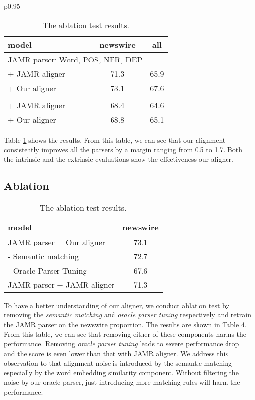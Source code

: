 \documentclass[11pt,a4paper]{article}
\begin{document}
\begin{table}[t]
\begin{tabular}{p{}}
\begin{table}[t]
	\centering
	\begin{tabular}{lcc}
		\hline
		model & newswire & all \\
		\hline
		\multicolumn{2}{l}{JAMR parser: Word, POS, NER, DEP} & \\
		\quad + JAMR aligner & 71.3 & 65.9 \\
		\quad + Our aligner & 73.1 & 67.6 \\
		\hdashline
		\multicolumn{2}{l}{CAMR parser: Word, POS, NER, DEP} & \\
		\quad + JAMR aligner & 68.4 & 64.6 \\
		\quad + Our aligner & 68.8 & 65.1 \\
		\hline
	\end{tabular}
	\caption{The parsing results.
	}\label{tbl:ext-eval}
\end{table}

Table \ref{tbl:ext-eval} shows the results.
From this table, we can see that our alignment
consistently improves all the parsers by a margin ranging
from 0.5 to 1.7.
Both the intrinsic and the extrinsic evaluations show the effectiveness
our aligner.

\subsection{Ablation}

\begin{table}[t]
	\centering
	\begin{tabular}{lc}
		\hline
		model & newswire  \\
		\hline
		JAMR parser + Our aligner & 73.1 \\
		\quad - Semantic matching & 72.7 \\
		\quad - Oracle Parser Tuning & 67.6 \\
		JAMR parser + JAMR aligner & 71.3 \\
		\hline
	\end{tabular}
	\caption{The ablation test results.}\label{tbl:abl-test}
\end{table}

To have a better understanding of our aligner, we conduct
ablation test by removing the
{\it semantic matching} and {\it oracle parser tuning} respectively
and retrain the JAMR parser on the newswire proportion.
The results are shown in Table \ref{tbl:abl-test}.
From this table, we can see that removing either of these components
harms the performance. 
Removing {\it oracle parser tuning} leads to severe performance drop
and the score is even lower than that with JAMR aligner.
We address this observation to that alignment noise is introduced by
the semantic matching especially by the word embedding similarity component.
Without filtering the noise by our oracle parser,
just introducing more matching rules will harm the performance.


\end{tabular}
\end{table}
\end{document}
